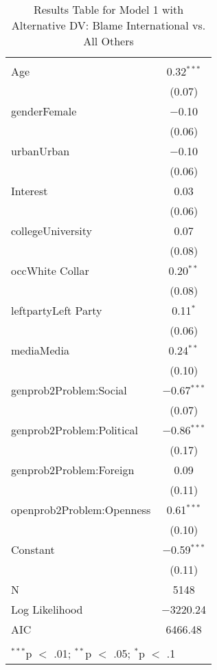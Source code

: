 
\begin{table}[!htbp] \centering 
  \caption{Results Table for Model 1 with Alternative DV: Blame International vs. All Others} 
  \label{} 
\footnotesize 
\begin{tabular}{@{\extracolsep{5pt}}lc} 
\\[-1.8ex]\hline \\[-1.8ex] 
\hline \\[-1.8ex] 
 Age & 0.32$^{***}$ \\ 
  & (0.07) \\ 
  genderFemale & $-$0.10 \\ 
  & (0.06) \\ 
  urbanUrban & $-$0.10 \\ 
  & (0.06) \\ 
  Interest & 0.03 \\ 
  & (0.06) \\ 
  collegeUniversity & 0.07 \\ 
  & (0.08) \\ 
  occWhite Collar & 0.20$^{**}$ \\ 
  & (0.08) \\ 
  leftpartyLeft Party & 0.11$^{*}$ \\ 
  & (0.06) \\ 
  mediaMedia & 0.24$^{**}$ \\ 
  & (0.10) \\ 
  genprob2Problem:Social & $-$0.67$^{***}$ \\ 
  & (0.07) \\ 
  genprob2Problem:Political & $-$0.86$^{***}$ \\ 
  & (0.17) \\ 
  genprob2Problem:Foreign & 0.09 \\ 
  & (0.11) \\ 
  openprob2Problem:Openness & 0.61$^{***}$ \\ 
  & (0.10) \\ 
  Constant & $-$0.59$^{***}$ \\ 
  & (0.11) \\ 
 N & 5148 \\ 
Log Likelihood & $-$3220.24 \\ 
AIC & 6466.48 \\ 
\hline \\[-1.8ex] 
\multicolumn{2}{l}{$^{***}$p $<$ .01; $^{**}$p $<$ .05; $^{*}$p $<$ .1} \\ 
\end{tabular} 
\end{table} 
